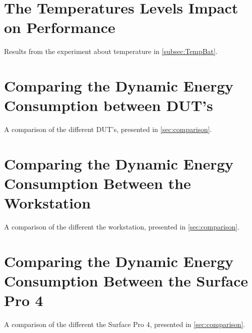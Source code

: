 \section{The Temperatures Levels Impact on Performance}\label{app:temperature}
Results from the experiment about temperature in \cref{subsec:TempBat}.



\newpage


\section{Comparing the Dynamic Energy Consumption between DUT's}\label{app:comparison}
A comparison of the different DUT's, presented in \cref{sec:comparison}.



% 
% 
\newpage


\section{Comparing the Dynamic Energy Consumption Between the Workstation}\label{app:comparison_workstation}
A comparison of the different the workstation, presented in \cref{sec:comparison}.
% 
% 



\newpage

\section{Comparing the Dynamic Energy Consumption Between the Surface Pro 4}\label{app:comparison_surfacepro4}
% 
% 
A comparison of the different the Surface Pro 4, presented in \cref{sec:comparison}.


\newpage


